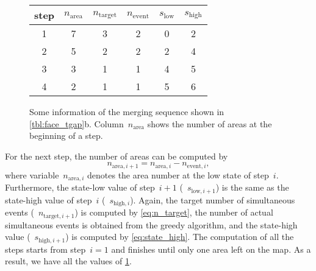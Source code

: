 \documentclass[twocolumn]{svjour3}          %
\begin{document}
\begin{figure}[h]
%
%
%
\captionsetup*{type=table}
\caption{Some information of the merging sequence 
shown in \tabl\ref{tbl:face_tgap}b.
Column~$n_\mathrm{area}$ shows the number of areas
at the beginning of a step.
}
\label{tbl:sequence_greedy}
\centering
\begin{tabular}{cccccc}
\toprule
step & $n_\mathrm{area}$ & $n_\mathrm{target}$ 
& $n_\mathrm{event}$ & $s_\mathrm{low}$ & $s_\mathrm{high}$ \\ \midrule
1        & 7      & 3        & 2        & 0      & 2      \\
2        & 5      & 2        & 2        & 2      & 4      \\
3        & 3      & 1        & 1        & 4      & 5      \\
4        & 2      & 1        & 1        & 5      & 6      \\
\bottomrule
\end{tabular}
\end{figure}

For the next step, the number of areas can be computed by
$$
n_{\mathrm{area},i+1} = n_{\mathrm{area},i} - n_{\mathrm{event},i},
$$
where variable~$n_{\mathrm{area},i}$ denotes the area number 
at the low state of step~$i$.
Furthermore, the state-low value of step~$i+1$ 
(\ie~$s_{\mathrm{low},i+1}$) 
is the same as the state-high value of step~$i$ 
(\ie~$s_{\mathrm{high},i}$).
Again, the target number of simultaneous events 
(\ie~$n_{\mathrm{target},i+1}$)
is computed by \eq\ref{eq:n_target},
the number of actual simultaneous events 
is obtained from the greedy algorithm,
and the state-high value (\ie~$s_{\mathrm{high},i+1}$) 
is computed by \eq\ref{eq:state_high}.
The computation of all the steps starts from step~$i=1$ and 
finishes until only one area left on the map.
As a result, we have all the values of \tabl\ref{tbl:sequence_greedy}.
\end{document}
